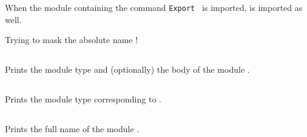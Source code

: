 \begin{Variants}
\item{}

  When the module containing the command {\tt Export {\qualid}} is
  imported, {\qualid} is imported as well.
\end{Variants}

\begin{ErrMsgs}
  \item {}
\end{ErrMsgs}

\begin{Warnings}
  \item Trying to mask the absolute name {\qualid} !
\end{Warnings}

\subsection{}

Prints the module type and (optionally) the body of the module {\ident}.

\subsection{}

Prints the module type corresponding to {\ident}.

\subsection{}

Prints the full name of the module {\qualid}.


